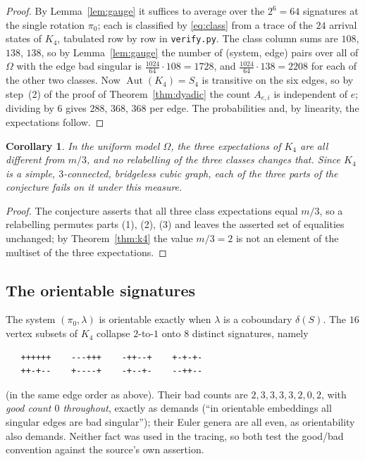 \documentclass[11pt]{amsart}
\newtheorem{corollary}[theorem]{Corollary}
\DeclareMathOperator{\Aut}{Aut}
\begin{document}
\begin{proof}
By Lemma~\ref{lem:gauge} it suffices to average over the $2^6=64$ signatures
at the single rotation $\pi_0$; each is classified by \eqref{eq:class} from a
trace of the $24$ arrival states of $K_4$, tabulated row by row in
\texttt{verify.py}. The class column
sums are $108$, $138$, $138$, so by Lemma~\ref{lem:gauge} the number of
(system, edge) pairs over all of $\Omega$ with the edge bad singular is
$\tfrac{1024}{64}\cdot 108=1728$, and $\tfrac{1024}{64}\cdot 138=2208$ for each
of the other two classes. Now $\Aut(K_4)=S_4$ is transitive on the six edges,
so by step~(2) of the proof of Theorem~\ref{thm:dyadic} the count $A_{e,i}$ is
independent of $e$; dividing by $6$ gives $288$, $368$, $368$ per edge. The
probabilities and, by linearity, the expectations follow.
\end{proof}

\begin{corollary}\label{cor:k4}
In the uniform model $\Omega$, the three expectations of $K_4$ are all
different from $m/3$, and no relabelling of the three classes changes that.
Since $K_4$ is a simple, $3$-connected, bridgeless cubic graph, each of the
three parts of the conjecture fails on it under this measure.
\end{corollary}

\begin{proof}
The conjecture asserts that all three class expectations equal $m/3$, so a
relabelling permutes parts (1), (2), (3) and leaves the asserted set of
equalities unchanged; by Theorem~\ref{thm:k4} the value $m/3=2$ is not an
element of the multiset of the three expectations.
\end{proof}

\subsection*{The orientable signatures}
The system $(\pi_0,\lambda)$ is orientable exactly when $\lambda$ is a
coboundary $\delta(S)$. The $16$ vertex subsets of $K_4$ collapse $2$-to-$1$
onto $8$ distinct signatures, namely
\begingroup\small
\begin{verbatim}
   ++++++    ---+++    -++--+    +-+-+-
   ++-+--    +----+    -+--+-    --++--
\end{verbatim}
\endgroup
\noindent
(in the same edge order as above). Their bad counts are
$2,3,3,3,3,2,0,2$, with \emph{good count $0$
throughout}, exactly as \cite[\texttt{main.tex} line 119]{GS} demands
(``in orientable embeddings all singular edges are bad singular''); their
Euler genera are all even, as orientability also demands. Neither fact was
used in the tracing, so both test the good/bad convention against the
source's own assertion.
\end{document}
